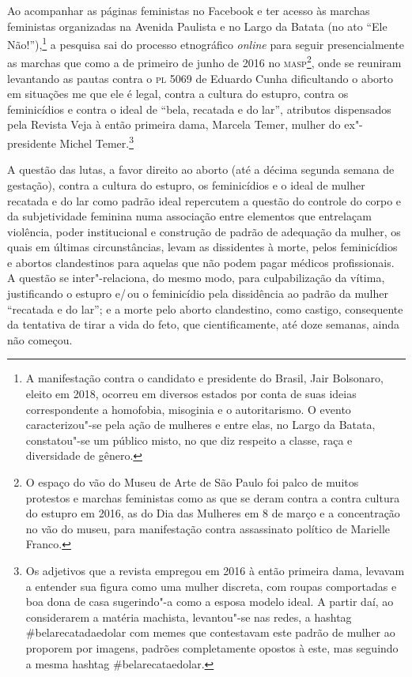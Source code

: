 Ao acompanhar as páginas feministas no Facebook e ter acesso às marchas
feministas organizadas na Avenida Paulista e no Largo da Batata (no ato
``Ele Não!''),\footnote{A manifestação contra o candidato e presidente do
  Brasil, Jair Bolsonaro, eleito em 2018, ocorreu em diversos estados por
  conta de suas ideias correspondente a homofobia, misoginia e o
  autoritarismo. O evento caracterizou"-se pela ação de mulheres e entre
  elas, no Largo da Batata, constatou"-se um público misto, no que diz
  respeito a classe, raça e diversidade de gênero.} a pesquisa sai
do processo etnográfico \textit{online} para seguir presencialmente as marchas
que como a de primeiro de junho de 2016 no \textsc{masp}\footnote{O espaço do vão
  do Museu de Arte de São Paulo foi palco de muitos protestos e marchas
  feministas como as que se deram contra a contra cultura do estupro em
  2016, as do Dia das Mulheres em 8 de março e a concentração no vão do
  museu, para manifestação contra assassinato político de Marielle
  Franco.}, onde se reuniram levantando as pautas contra o \textsc{pl} 5069 de
Eduardo Cunha dificultando o aborto em situações me que ele é legal,
contra a cultura do estupro, contra os feminicídios e contra o ideal de
``bela, recatada e do lar'', atributos dispensados pela Revista Veja à
então primeira dama, Marcela Temer, mulher do ex"-presidente Michel
Temer.\footnote{Os adjetivos que a revista empregou em 2016 à então
  primeira dama, levavam a entender sua figura como uma mulher discreta,
  com roupas comportadas e boa dona de casa sugerindo"-a como a esposa
  modelo ideal. A partir daí, ao considerarem a matéria machista,
  levantou"-se nas redes, a hashtag \#belarecatadaedolar com memes que
  contestavam este padrão de mulher ao proporem por imagens, padrões
  completamente opostos à este, mas seguindo a mesma hashtag
  \#belarecataedolar.}

A questão das lutas, a favor direito ao aborto (até a décima segunda
semana de gestação), contra a cultura do estupro, os feminicídios e o
ideal de mulher recatada e do lar como padrão ideal repercutem a questão
do controle do corpo e da subjetividade feminina numa associação entre
elementos que entrelaçam violência, poder institucional e construção de
padrão de adequação da mulher, os quais em últimas circunstâncias, levam
as dissidentes à morte, pelos feminicídios e abortos clandestinos para
aquelas que não podem pagar médicos profissionais. A questão se
inter"-relaciona, do mesmo modo, para culpabilização da vítima,
justificando o estupro e/\,ou o feminicídio pela dissidência ao padrão da
mulher ``recatada e do lar''; e a morte pelo aborto clandestino, como
castigo, consequente da tentativa de tirar a vida do feto, que
cientificamente, até doze semanas, ainda não começou.

